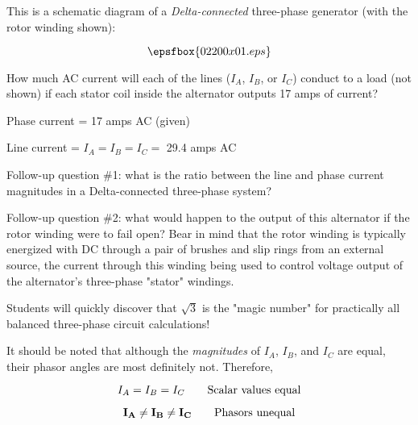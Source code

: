 

This is a schematic diagram of a {\it Delta-connected} three-phase generator (with the rotor winding shown):

$$\epsfbox{02200x01.eps}$$

How much AC current will each of the lines ($I_A$, $I_B$, or $I_C$) conduct to a load (not shown) if each stator coil inside the alternator outputs 17 amps of current?







Phase current = 17 amps AC (given)

Line current = $I_A = I_B = I_C =$ 29.4 amps AC

\vskip 10pt

Follow-up question \#1: what is the ratio between the line and phase current magnitudes in a Delta-connected three-phase system?

\vskip 10pt

Follow-up question \#2: what would happen to the output of this alternator if the rotor winding were to fail open?  Bear in mind that the rotor winding is typically energized with DC through a pair of brushes and slip rings from an external source, the current through this winding being used to control voltage output of the alternator's three-phase "stator" windings.







Students will quickly discover that $\sqrt{3}$ is the "magic number" for practically all balanced three-phase circuit calculations!

It should be noted that although the {\it magnitudes} of $I_A$, $I_B$, and $I_C$ are equal, their phasor angles are most definitely not.  Therefore,

$$I_A = I_B = I_C \hbox{\hskip 20pt Scalar values equal}$$

$${\bf I_A} \neq {\bf I_B} \neq {\bf I_C} \hbox{\hskip 20pt Phasors unequal}$$




